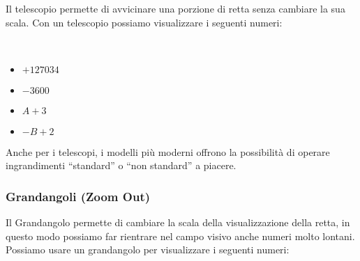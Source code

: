 Il telescopio permette di avvicinare una porzione di retta senza cambiare 
la sua scala. Con un telescopio possiamo visualizzare i seguenti numeri:


\begin{esempio} ~

\begin{multicols}{4}
\begin{itemize}[nosep]
 \item \(+127034\)
 \item \(-3600\)
 \item \(A+3\)
 \item \(-B+2\)
\end{itemize}
\end{multicols}
\vspace{-5mm}

\begin{inaccessibleblock}
\begin{minipage}{.48\linewidth}
 \begin{center}
\scalebox{0.7}{\telescopioa}
 \end{center}
\end{minipage}
\hfill
\begin{minipage}{.48\linewidth}
 \begin{center}
\scalebox{0.7}{\telescopiob}
 \end{center}
\end{minipage}
\end{inaccessibleblock}
\end{esempio}

Anche per i telescopi, i modelli più moderni offrono la possibilità di 
operare ingrandimenti ``standard'' o ``non standard'' a piacere.

\subsubsection{Grandangoli (Zoom Out)}
\label{subsec:insnum_zoom}

Il Grandangolo permette di cambiare la scala della visualizzazione della 
retta, in questo modo possiamo far rientrare nel campo visivo anche numeri 
molto lontani.
Possiamo usare un grandangolo per visualizzare i seguenti numeri:

